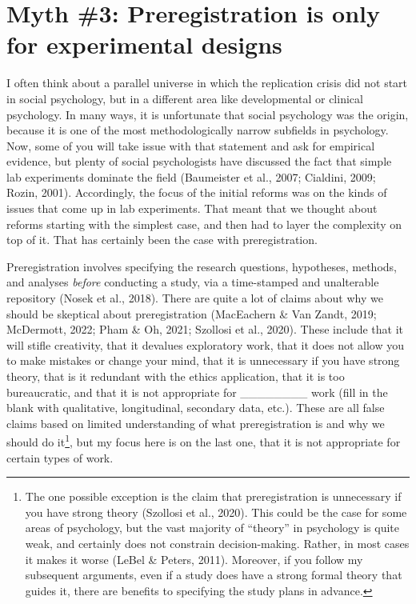 \documentclass[authordate, empirical,issue]{jote-new-article}
\begin{document}
\section{Myth \#3: Preregistration is only for experimental designs}







I often think about a parallel universe in which the replication crisis did not start in social psychology, but in a different area like developmental or clinical psychology. In many ways, it is unfortunate that social psychology was the origin, because it is one of the most methodologically narrow subfields in psychology. Now, some of you will take issue with that statement and ask for empirical evidence, but plenty of social psychologists have discussed the fact that simple lab experiments dominate the field (Baumeister et al., 2007; Cialdini, 2009; Rozin, 2001). Accordingly, the focus of the initial reforms was on the kinds of issues that come up in lab experiments. That meant that we thought about reforms starting with the simplest case, and then had to layer the complexity on top of it. That has certainly been the case with preregistration.







Preregistration involves specifying the research questions, hypotheses, methods, and analyses \emph{before} conducting a study, via a time-stamped and unalterable repository (Nosek et al., 2018). There are quite a lot of claims about why we should be skeptical about preregistration (MacEachern \& Van Zandt, 2019; McDermott, 2022; Pham \& Oh, 2021; Szollosi et al., 2020). These include that it will stifle creativity, that it devalues exploratory work, that it does not allow you to make mistakes or change your mind, that it is unnecessary if you have strong theory, that is it redundant with the ethics application, that it is too bureaucratic, and that it is not appropriate for \_\_\_\_\_\_\_\_ work (fill in the blank with qualitative, longitudinal, secondary data, etc.). These are all false claims based on limited understanding of what preregistration is and why we should do it\footnote{ The one possible exception is the claim that preregistration is unnecessary if you have strong theory (Szollosi et al.,
  2020). This could be the case for some areas of psychology, but the vast majority of “theory” in psychology is quite weak, and certainly does not constrain decision-making. Rather, in most cases it makes it worse (LeBel \& Peters, 2011). Moreover, if you follow my subsequent arguments, even if a study does have a strong formal theory that guides it, there are benefits to specifying the study plans in advance. }, but my focus here is on the last one, that it is not appropriate for certain types of work.
\end{document}

